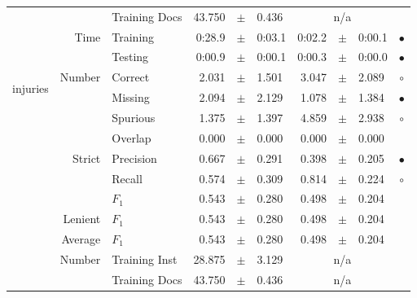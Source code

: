 \begin{longtable}{|r|r|l||rcl|rcl|c|}
\cline{3-10} &                             &   Training Docs &      43.750 &  $\pm$  &       0.436 &    \multicolumn{3}{c|}{n/a}         &  \\
\cline{2-10} & \multirow{2}{*}{      Time} &        Training &      0:28.9 &  $\pm$  &      0:03.1 &      0:02.2 &  $\pm$  &      0:00.1 & $\bullet$ \\
\cline{3-10} &                             &         Testing &      0:00.9 &  $\pm$  &      0:00.1 &      0:00.3 &  $\pm$  &      0:00.0 & $\bullet$ \\
\hline
\hline
\multirow{11}{*}{\begin{sideways}injuries\end{sideways} }
             & \multirow{4}{*}{    Number} &         Correct &       2.031 &  $\pm$  &       1.501 &       3.047 &  $\pm$  &       2.089 & $\circ$ \\
\cline{3-10} &                             &         Missing &       2.094 &  $\pm$  &       2.129 &       1.078 &  $\pm$  &       1.384 & $\bullet$ \\
\cline{3-10} &                             &        Spurious &       1.375 &  $\pm$  &       1.397 &       4.859 &  $\pm$  &       2.938 & $\circ$ \\
\cline{3-10} &                             &         Overlap &       0.000 &  $\pm$  &       0.000 &       0.000 &  $\pm$  &       0.000 &  \\
\cline{2-10} & \multirow{3}{*}{    Strict} &       Precision &       0.667 &  $\pm$  &       0.291 &       0.398 &  $\pm$  &       0.205 & $\bullet$ \\
\cline{3-10} &                             &          Recall &       0.574 &  $\pm$  &       0.309 &       0.814 &  $\pm$  &       0.224 & $\circ$ \\
\cline{3-10} &                             &           $F_1$ &       0.543 &  $\pm$  &       0.280 &       0.498 &  $\pm$  &       0.204 &  \\
\cline{2-10} &                     Lenient &           $F_1$ &       0.543 &  $\pm$  &       0.280 &       0.498 &  $\pm$  &       0.204 &  \\
\cline{2-10} &                     Average &           $F_1$ &       0.543 &  $\pm$  &       0.280 &       0.498 &  $\pm$  &       0.204 &  \\
\cline{2-10} & \multirow{2}{*}{    Number} &   Training Inst &      28.875 &  $\pm$  &       3.129 &    \multicolumn{3}{c|}{n/a}         &  \\
\cline{3-10} &                             &   Training Docs &      43.750 &  $\pm$  &       0.436 &    \multicolumn{3}{c|}{n/a}         &  \\

\end{longtable}
